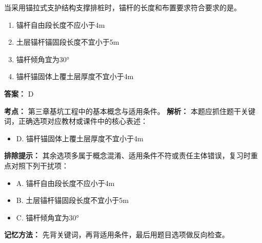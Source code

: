 \documentclass[UTF8,fontset=fandol,11pt]{ctexart}
\begin{document}
\begin{quizbox}[title={第 2 题}]
当采用锚拉式支护结构支撑排桩时，锚杆的长度和布置要求符合要求的是。\\
\begin{enumerate}[label=\Alph*.]
\item 锚杆自由段长度不应小于4m
\item 土层锚杆锚固段长度不宜小于5m
\item 锚杆倾角宜为30°
\item 锚杆锚固体上覆土层厚度不宜小于4m
\end{enumerate}
\textbf{答案：} D
\vspace{0.25em}
\begin{answerbox}[title={考点解析}]
\textbf{考点：} 第三章基坑工程中的基本概念与适用条件。
\textbf{解析：} 本题应抓住题干关键词，正确选项对应教材或课件中的核心表述：
\begin{itemize}
\item D. 锚杆锚固体上覆土层厚度不宜小于4m
\end{itemize}
\textbf{排除提示：} 其余选项多属于概念混淆、适用条件不符或责任主体错误，复习时重点对照下列干扰项：
\begin{itemize}
\item A. 锚杆自由段长度不应小于4m
\item B. 土层锚杆锚固段长度不宜小于5m
\item C. 锚杆倾角宜为30°
\end{itemize}
\textbf{记忆方法：} 先背关键词，再背适用条件，最后用题目选项做反向检查。
\end{answerbox}
\end{quizbox}

\vspace{0.2em}
\end{document}
